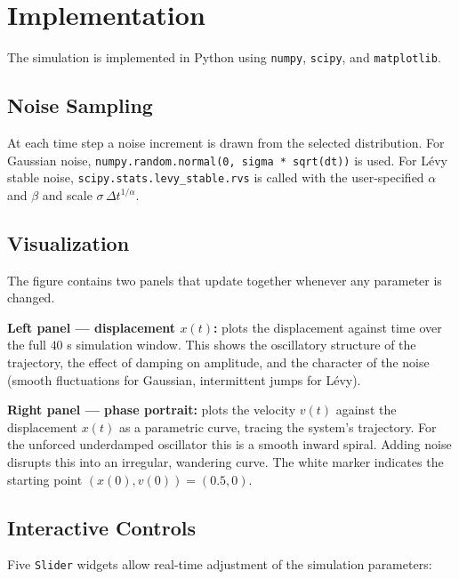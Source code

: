 \documentclass[12pt]{article}
\begin{document}
\section{Implementation}

The simulation is implemented in Python using \texttt{numpy},
\texttt{scipy}, and \texttt{matplotlib}.

\subsection{Noise Sampling}

At each time step a noise increment is drawn from the selected distribution.
For Gaussian noise, \texttt{numpy.random.normal(0, sigma * sqrt(dt))} is used.
For L\'{e}vy stable noise, \texttt{scipy.stats.levy\_stable.rvs} is called
with the user-specified $\alpha$ and $\beta$ and scale $\sigma\,\Delta t^{1/\alpha}$.

\subsection{Visualization}

The figure contains two panels that update together whenever any parameter is changed.

\textbf{Left panel --- displacement $x(t)$:} plots the displacement against time
over the full $40$ s simulation window. This shows the oscillatory structure of
the trajectory, the effect of damping on amplitude, and the character of the noise
(smooth fluctuations for Gaussian, intermittent jumps for L\'{e}vy).

\textbf{Right panel --- phase portrait:} plots the velocity $v(t)$ against the
displacement $x(t)$ as a parametric curve, tracing the system's trajectory. For the unforced underdamped oscillator this is a smooth inward spiral. Adding noise disrupts this into an irregular, wandering curve. The white
marker indicates the starting point $(x(0), v(0)) = (0.5, 0)$.

\subsection{Interactive Controls}

Five \texttt{Slider} widgets allow real-time adjustment of the simulation
parameters:
\end{document}

